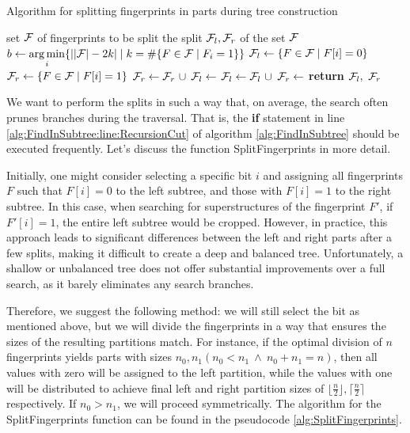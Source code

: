 \begin{algorithm}
  \caption{Algorithm for splitting fingerprints in parts during tree construction} \label{alg:SplitFingerprints}
  \begin{algorithmic}[1]
    \Require set $\mathcal{F}$ of fingerprints to be split
    \Ensure the split $\mathcal{F}_l, \mathcal{F}_r$ of the set $\mathcal{F}$
      \State $b \gets \operatorname*{arg\,min}\limits_{i}\{ \left| |\mathcal{F}| - 2k \right| \mid k = \# \{F \in \mathcal{F} \mid F_i = 1 \} \}$ %
      \State $\mathcal{F}_l \gets \{F \in \mathcal{F} \mid F[i] = 0\}$
      \State $\mathcal{F}_r \gets \{F \in \mathcal{F} \mid F[i] = 1\}$ 
	\State $\F_r \gets \F_r \ \cup$ 
	\State $\mathcal{F}_l \gets $  
	\State $\mathcal{F}_l \gets \mathcal{F}_l \ \cup$ 
	\State $\mathcal{F}_r \gets $  
      \EndIf
      \State \textbf{return} $\mathcal{F}_l, \ \mathcal{F}_r$ 
    \EndProcedure
  \end{algorithmic}
\end{algorithm}

We want to perform the splits in such a way that, on average, the search often prunes branches during the traversal. That is, the {\bf if} statement in line \ref{alg:FindInSubtree:line:RecursionCut} of algorithm \ref{alg:FindInSubtree} should be executed frequently. Let's discuss the function SplitFingerprints in more detail.

Initially, one might consider selecting a specific bit $i$ and assigning all fingerprints $F$ such that $F[i] = 0$ to the left subtree, and those with $F[i] = 1$ to the right subtree. In this case, when searching for superstructures of the fingerprint $F'$, if $F'[i] = 1$, the entire left subtree would be cropped. However, in practice, this approach leads to significant differences between the left and right parts after a few splits, making it difficult to create a deep and balanced tree. Unfortunately, a shallow or unbalanced tree does not offer substantial improvements over a full search, as it barely eliminates any search branches.

Therefore, we suggest the following method: we will still select the bit as mentioned above, but we will divide the fingerprints in a way that ensures the sizes of the resulting partitions match. For instance, if the optimal division of $n$ fingerprints yields parts with sizes $n_0, n_1 (n_0 < n_1 \ \land \ n_0 + n_1 = n)$, then all values with zero will be assigned to the left partition, while the values with one will be distributed to achieve final left and right partition sizes of $\lfloor\frac{n}{2}\rfloor, \lceil \frac{n}{2} \rceil$ respectively. If $n_0 > n_1$, we will proceed symmetrically. The algorithm for the SplitFingerprints function can be found in the pseudocode \ref{alg:SplitFingerprints}.
